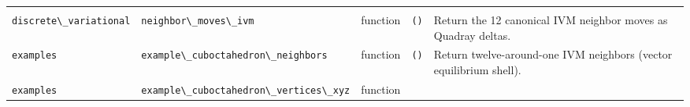 \documentclass[
  10pt,
]{article}
\newcommand{\passthrough}[1]{#1}
\begin{document}
\begin{longtable}[]{@{}lllll@{}}
\begin{minipage}[t]{0.17\columnwidth}
\end{minipage}\tabularnewline
\begin{minipage}[t]{0.17\columnwidth}\raggedright
\passthrough{\lstinline!discrete\_variational!}\strut
\end{minipage} & \begin{minipage}[t]{0.17\columnwidth}\raggedright
\passthrough{\lstinline!neighbor\_moves\_ivm!}\strut
\end{minipage} & \begin{minipage}[t]{0.17\columnwidth}\raggedright
function\strut
\end{minipage} & \begin{minipage}[t]{0.17\columnwidth}\raggedright
\passthrough{\lstinline!()!}\strut
\end{minipage} & \begin{minipage}[t]{0.17\columnwidth}\raggedright
Return the 12 canonical IVM neighbor moves as Quadray deltas.\strut
\end{minipage}\tabularnewline
\begin{minipage}[t]{0.17\columnwidth}\raggedright
\passthrough{\lstinline!examples!}\strut
\end{minipage} & \begin{minipage}[t]{0.17\columnwidth}\raggedright
\passthrough{\lstinline!example\_cuboctahedron\_neighbors!}\strut
\end{minipage} & \begin{minipage}[t]{0.17\columnwidth}\raggedright
function\strut
\end{minipage} & \begin{minipage}[t]{0.17\columnwidth}\raggedright
\passthrough{\lstinline!()!}\strut
\end{minipage} & \begin{minipage}[t]{0.17\columnwidth}\raggedright
Return twelve-around-one IVM neighbors (vector equilibrium shell).\strut
\end{minipage}\tabularnewline
\begin{minipage}[t]{0.17\columnwidth}\raggedright
\passthrough{\lstinline!examples!}\strut
\end{minipage} & \begin{minipage}[t]{0.17\columnwidth}\raggedright
\passthrough{\lstinline!example\_cuboctahedron\_vertices\_xyz!}\strut
\end{minipage} & \begin{minipage}[t]{0.17\columnwidth}\raggedright
function\strut
\end{minipage} & \begin{minipage}[t]{0.17\columnwidth}\raggedright

\end{minipage}
\end{longtable}
\end{document}
